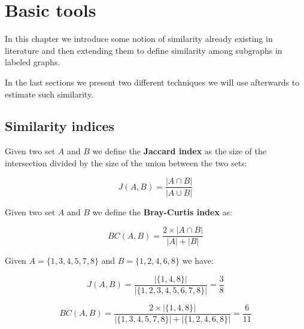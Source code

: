 
\chapter{Basic tools}

In this chapter we introduce some notion of similarity already existing in literature and then extending them to define similarity among subgraphs in labeled graphs.

In the last sections we present two different techniques we will use afterwards to estimate such similarity.

\section{Similarity indices}

\begin{definizione}\label{def:jaccard}
    Given two set $A$ and $B$ we define the \textbf{Jaccard index} as the size of the intersection divided by the size of the union between the two sets:
    
    \begin{equation}
    J(A,B) = \frac{|A \cap B|}{|A \cup B|}
    \end{equation}
    
\end{definizione}

\begin{definizione}\label{def:bray}
    Given two set $A$ and $B$ we define the \textbf{Bray-Curtis index} as:
    
    \begin{equation}
    BC(A,B) = \frac{2 \times |A \cap B|}{|A| + |B|}
    \end{equation}
    
\end{definizione}

\begin{esempio}
	Given $A = \{1, 3, 4, 5, 7, 8\}$ and $B = \{1, 2, 4, 6, 8\}$ we have:
	
	\begin{equation*}
	J(A,B) = \frac{|\{1, 4, 8\}|}{|\{1, 2, 3, 4, 5, 6, 7, 8\}|} = \frac{3}{8} 
	\end{equation*}
	
	\begin{equation*}
	BC(A,B) = \frac{2 \times |\{1, 4, 8\}|}{|\{1, 3, 4, 5, 7, 8\}| + |\{1, 2, 4, 6, 8\}|} = \frac{6}{11} 
	\end{equation*}
\end{esempio}



